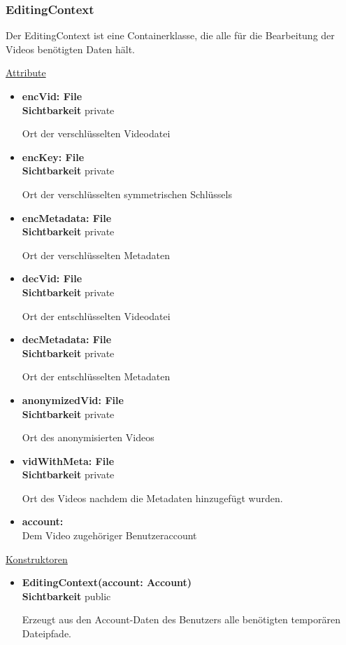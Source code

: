 \subsubsection{EditingContext} \label{service:klasse:EditingContext}
Der EditingContext ist eine Containerklasse, die alle für die Bearbeitung der Videos benötigten Daten hält. \newline

\underline{Attribute}
\begin{itemize}
\itemsep0pt
\item \textbf{encVid: File} \hfill\\ 
\textbf{Sichtbarkeit} private

Ort der verschlüsselten Videodatei

\item \textbf{encKey: File} \hfill\\ 
\textbf{Sichtbarkeit} private

Ort der verschlüsselten symmetrischen Schlüssels

\item \textbf{encMetadata: File} \hfill\\
\textbf{Sichtbarkeit} private
 
Ort der verschlüsselten Metadaten

\item \textbf{decVid: File} \hfill\\ 
\textbf{Sichtbarkeit} private

Ort der entschlüsselten Videodatei

\item \textbf{decMetadata: File} \hfill\\ 
\textbf{Sichtbarkeit} private

Ort der entschlüsselten Metadaten

\item \textbf{anonymizedVid: File} \hfill\\ 
\textbf{Sichtbarkeit} private

Ort des anonymisierten Videos

\item \textbf{vidWithMeta: File} \hfill\\ 
\textbf{Sichtbarkeit} private

Ort des Videos nachdem die Metadaten hinzugefügt wurden.

\item \textbf{account: } \hfill\\ 
Dem Video zugehöriger Benutzeraccount
\end{itemize}

\underline{Konstruktoren}
\begin{itemize}
\itemsep0pt
\item \textbf{EditingContext(account: Account)} \hfill\\
\textbf{Sichtbarkeit} public

Erzeugt aus den Account-Daten des Benutzers alle benötigten temporären Dateipfade.
\end{itemize}
